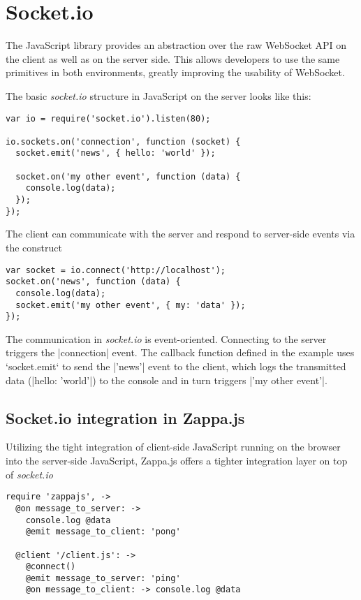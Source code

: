 \section{Socket.io}

The JavaScript library  provides
an abstraction over the raw WebSocket API on the client as well as on the server
side. This allows developers to use the same primitives in both environments,
greatly improving the usability of WebSocket.

The basic \emph{socket.io} structure in JavaScript on the server looks like this:

\begin{verbatim}
var io = require('socket.io').listen(80);

io.sockets.on('connection', function (socket) {
  socket.emit('news', { hello: 'world' });

  socket.on('my other event', function (data) {
    console.log(data);
  });
});
\end{verbatim}

The client can communicate with the server and respond to server-side events via
the construct

\begin{verbatim}
var socket = io.connect('http://localhost');
socket.on('news', function (data) {
  console.log(data);
  socket.emit('my other event', { my: 'data' });
});
\end{verbatim}

The communication in \emph{socket.io} is event-oriented. Connecting to the server
triggers the |connection| event. The callback function defined in the example
uses `socket.emit` to send the |'news'| event to the client, which logs the
transmitted data (|{hello: 'world'}|) to the console and in turn triggers
 |'my other event'|.


\pagebreak
\subsection{Socket.io integration in Zappa.js}

Utilizing the tight integration of client-side JavaScript running on the browser
into the server-side JavaScript, Zappa.js offers a tighter integration layer on
top of \emph{socket.io}

\begin{verbatim}
require 'zappajs', ->
  @on message_to_server: ->
    console.log @data
    @emit message_to_client: 'pong'

  @client '/client.js': ->
    @connect()
    @emit message_to_server: 'ping'
    @on message_to_client: -> console.log @data
\end{verbatim}

